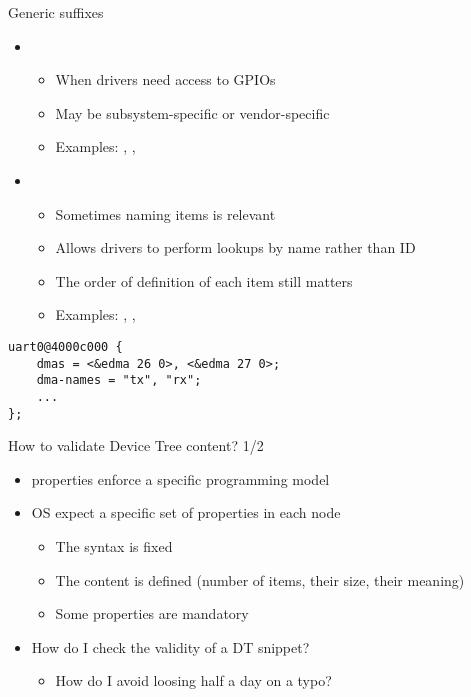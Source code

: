 \begin{frame}[fragile]{Generic suffixes}
  \begin{itemize}
  \item {}
    \begin{itemize}
    \item When drivers need access to GPIOs
    \item May be subsystem-specific or vendor-specific
    \item Examples: , , 
    \end{itemize}
  \item {}
    \begin{itemize}
    \item Sometimes naming items is relevant
    \item Allows drivers to perform lookups by name rather than ID
    \item The order of definition of each item still matters
    \item Examples: , ,
    \end{itemize}
  \end{itemize}
  \begin{block}{}
    \begin{verbatim}
uart0@4000c000 {
    dmas = <&edma 26 0>, <&edma 27 0>;
    dma-names = "tx", "rx";
    ...
};
    \end{verbatim}
  \end{block}
\end{frame}

\begin{frame}{How to validate Device Tree content? 1/2}
  \begin{itemize}
  \item {} properties enforce a specific programming model
  \item OS expect a specific set of properties in each node
    \begin{itemize}
    \item The syntax is fixed
    \item The content is defined (number of items, their size, their meaning)
    \item Some properties are mandatory
    \end{itemize}
  \item How do I check the validity of a DT snippet?
    \begin{itemize}
    \item How do I avoid loosing half a day on a typo?
    \end{itemize}
  \end{itemize}
\end{frame}

